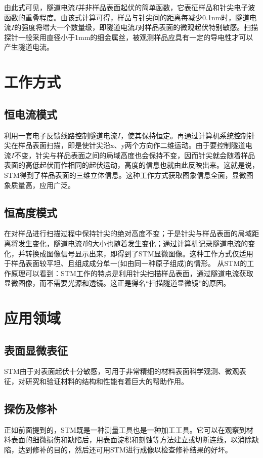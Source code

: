 \documentclass[a4paper, zihao=-4, linespread=1.25]{ctexrep}
\begin{document}
由此式可见，隧道电流$I$并非样品表面起伏的简单函数，它表征样品和针尖电子波函数的重叠程度。由该式计算可得，样品与针尖间的距离每减少0.1nm时，隧道电流$I$的强度将增大一个数量级，即隧道电流$I$对样品表面的微观起伏特别敏感。扫描探针一般采用直径小于1mm的细金属丝，被观测样品应具有一定的导电性才可以产生隧道电流。

\section{工作方式}
\subsection{恒电流模式}
利用一套电子反馈线路控制隧道电流$I$，使其保持恒定。再通过计算机系统控制针尖在样品表面扫描，即是使针尖沿x、y两个方向作二维运动。由于要控制隧道电流$I$不变，针尖与样品表面之间的局域高度也会保持不变，因而针尖就会随着样品表面的高低起伏而作相同的起伏运动，高度的信息也就由此反映出来。这就是说，STM得到了样品表面的三维立体信息。这种工作方式获取图象信息全面，显微图象质量高，应用广泛。
\subsection{恒高度模式}
在对样品进行扫描过程中保持针尖的绝对高度不变；于是针尖与样品表面的局域距离将发生变化，隧道电流$I$的大小也随着发生变化；通过计算机记录隧道电流的变化，并转换成图像信号显示出来，即得到了STM显微图像。这种工作方式仅适用于样品表面较平坦、且组成成分单一(如由同一种原子组成)的情形。 从STM的工作原理可以看到：STM工作的特点是利用针尖扫描样品表面，通过隧道电流获取显微图像，而不需要光源和透镜。这正是得名“扫描隧道显微镜”的原因。

\section{应用领域}
\subsection{表面显微表征}
STM由于对表面起伏十分敏感，可用于非常精细的材料表面科学观测、微观表征，对研究和验证材料的结构和性能有着巨大的帮助作用。
\subsection{探伤及修补}
正如前面提到的，STM既是一种测量工具也是一种加工工具。它可以在观察到材料表面的细微损伤和缺陷后，用表面淀积和刻蚀等方法建立或切断连线，以消除缺陷，达到修补的目的，然后还可用STM进行成像以检查修补结果的好坏。
\end{document}
